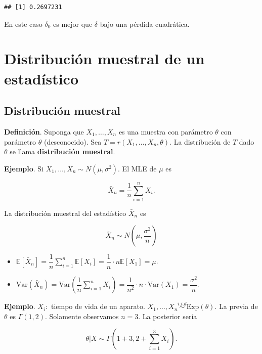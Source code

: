\documentclass[
  12pt,
]{book}
\begin{document}
\begin{verbatim}
## [1] 0.2697231
\end{verbatim}

En este caso \(\delta_0\) es mejor que \(\delta\) bajo una pérdida cuadrática.

\hypertarget{distribuciuxf3n-muestral-de-un-estaduxedstico}{%
\chapter{Distribución muestral de un estadístico}\label{distribuciuxf3n-muestral-de-un-estaduxedstico}}

\hypertarget{distribuciuxf3n-muestral}{%
\section{Distribución muestral}\label{distribuciuxf3n-muestral}}

\textbf{Definición}. Suponga que \(X_1,\dots,X_n\) es una muestra con parámetro
\(\theta\) con parámetro \(\theta\) (desconocido). Sea \(T=r(X_1,\dots,X_n,\theta)\). La
distribución de \(T\) dado \(\theta\) se llama \textbf{distribución muestral}.

\textbf{Ejemplo}. Si \(X_1,\dots,X_n \sim N(\mu,\sigma^2)\). El MLE de \(\mu\) es

\begin{equation*}
\bar X_n =\dfrac 1n \sum_{i=1}^n X_i.
\end{equation*}

La distribución muestral del estadístico \(\bar X_n\) es

\[
\bar X_n \sim N\left(\mu, \dfrac{\sigma^2}n \right)
\]

\begin{itemize}
\item
  \(\mathbb E[\bar X_n] = \dfrac 1n\displaystyle\sum_{i=1}^n\mathbb E[X_i] = \dfrac 1n\cdot n \mathbb E[X_1] = \mu\).
\item
  \(\text{Var}(\bar X_n) = \text{Var}\left(\dfrac 1n \displaystyle\sum_{i=1}^n X_i\right) = \dfrac{1}{n^2}\cdot n\cdot \text{Var}(X_1) = \dfrac{\sigma^2}n\).
\end{itemize}

\textbf{Ejemplo}. \(X_i:\) tiempo de vida de un aparato. \(X_1,\dots,X_n \stackrel{i.i.d}{\sim} \text{Exp}(\theta)\). La previa de \(\theta\) es \(\Gamma(1,2)\). Solamente
observamos \(n=3\). La posterior sería

\[
\theta|X \sim \Gamma(1+3,2+\sum_{i=1}^3 X_i). 
\]
\end{document}
